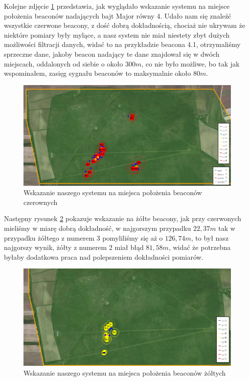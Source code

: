 Kolejne zdjęcie \ref{fig:wskazanieczerwone} przedstawia, jak wyglądało wskazanie systemu na miejsce położenia beaconów nadających bajt Major równy 4. Udało nam się znaleźć wszystkie czerwone beacony, z dość dobrą dokładnością, chociaż nie ukrywam że niektóre pomiary były mylące, a nasz system nie miał niestety zbyt dużych możliwości filtracji danych, widać to na przykładzie beacona 4.1, otrzymaliśmy sprzeczne dane, jakoby beacon nadający te dane znajdował się w dwóch miejscach, oddalonych od siebie o około $300 m$, co nie było możliwe, bo tak jak wspominałem, zasięg sygnału beaconów to maksymalnie około $80 m$.

\begin{figure}[!th]
    \centering
    \includegraphics[width=15cm]{zalaczniki/obrazy/wskazanie_czerwone.png}
    \caption{Wskazanie naszego systemu na miejsca położenia beaconów czerownych}
    \label{fig:wskazanieczerwone}
\end{figure}

Następny rysunek \ref{fig:wskazaniezolte} pokazuje wskazanie na żółte beacony, jak przy czerwonych mieliśmy w miarę dobrą dokładność, w najgorszym przypadku $22,37 m$ tak w przypadku żółtego z numerem 3 pomyliliśmy się aż o $126,74 m$, to był nasz najgorszy wynik, żółty z numerem 2 miał błąd $81,58 m$, widać że potrzebna byłaby dodatkowa praca nad polepszeniem dokładności pomiarów.

\begin{figure}[!th]
    \centering
    \includegraphics[width=15cm]{zalaczniki/obrazy/wskazanie_zolte.png}
    \caption{Wskazanie naszego systemu na miejsca położenia beaconów żółtych}
    \label{fig:wskazaniezolte}
\end{figure}

